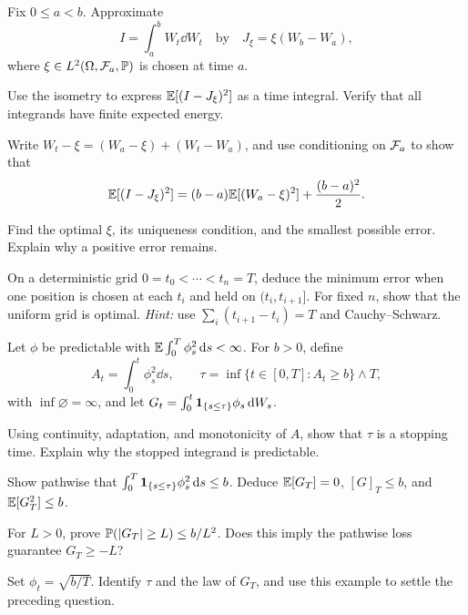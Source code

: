 \begin{exercise}
Fix \(0\leq a<b\). Approximate
\[
I=\int_a^b W_t\dd W_t
\quad\text{by}\quad
J_\xi=\xi(W_b-W_a),
\]
where \(\xi\in L^2(\Omega,\mathcal F_a,\mathbb P)\) is chosen at time \(a\).
\begin{exparts}
  \item Use the isometry to express \(\mathbb E[(I-J_\xi)^2]\) as a time
  integral. Verify that all integrands have finite expected energy.
  \item Write \(W_t-\xi=(W_a-\xi)+(W_t-W_a)\), and use conditioning
  on \(\mathcal F_a\) to show that
  \[
  \mathbb E[(I-J_\xi)^2]
  =(b-a)\mathbb E[(W_a-\xi)^2]+\frac{(b-a)^2}{2}.
  \]
  \item Find the optimal \(\xi\), its uniqueness condition, and the
  smallest possible error. Explain why a positive error remains.
  \item On a deterministic grid \(0=t_0<\cdots<t_n=T\), deduce the
  minimum error when one position is chosen at each \(t_i\) and held on
  \((t_i,t_{i+1}]\). For fixed \(n\), show that the uniform grid is optimal.
  \emph{Hint:} use \(\sum_i(t_{i+1}-t_i)=T\) and Cauchy--Schwarz.
\end{exparts}
\end{exercise}

\begin{exercise}
Let \(\phi\) be predictable with
\(\mathbb E\int_0^T\phi_s^2\,\mathrm d s<\infty\). For \(b>0\), define
\[
A_t=\int_0^t\phi_s^2\dd s,
\qquad
\tau=\inf\{t\in[0,T]:A_t\geq b\}\wedge T,
\]
with \(\inf\varnothing=\infty\), and let
\(G_t=\int_0^t\mathbf{1}_{\{s\leq\tau\}}\phi_s\,\mathrm d W_s\).
\begin{exparts}
  \item Using continuity, adaptation, and monotonicity of \(A\), show
  that \(\tau\) is a stopping time. Explain why the stopped integrand
  is predictable.
  \item Show pathwise that
  \(\int_0^T\mathbf{1}_{\{s\leq\tau\}}\phi_s^2\,\mathrm d s\leq b\).
  Deduce \(\mathbb E[G_T]=0\), \([G]_T\leq b\), and \(\mathbb E[G_T^2]\leq b\).
  \item For \(L>0\), prove \(\mathbb P(|G_T|\geq L)\leq b/L^2\).
  Does this imply the pathwise loss guarantee \(G_T\geq-L\)?
  \item Set \(\phi_t=\sqrt{b/T}\). Identify \(\tau\) and the law of
  \(G_T\), and use this example to settle the preceding question.
\end{exparts}
\end{exercise}
\fi

